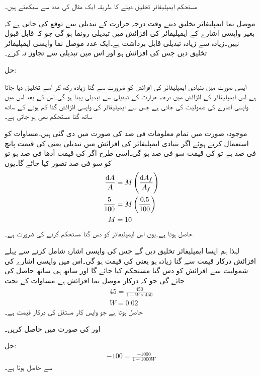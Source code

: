 مستحکم ایمپلیفائر تخلیق دینے کا طریقہ ایک مثال کی مدد سے سیکھتے ہیں۔

موصل نما ایمپلیفائر تخلیق دیتے وقت درجہ حرارت کے تبدیلی سے توقع کی جاتی ہے کہ بغیر واپسی اشارے کے ایمپلیفائر کی افزائش میں  تبدیلی رونما ہو گی جو کہ قابل قبول نہیں۔زیادہ سے
 زیادہ  تبدیلی قابل برداشت ہے۔ایک عدد موصل نما واپسی ایمپلیفائر تخلیق دیں جس کی افزائش  ہو اور اس میں تبدیلی  سے تجاوز نہ کرے۔

حل: 

ایسی صورت میں بنیادی ایمپلیفائر کی افزائش  کو ضرورت سے  گنا زیادہ رکھ کر اسے تخلیق دیا جاتا ہے۔اس ایمپلیفائر کے افزائش میں درجہ حرارت کے تبدیلی سے  تبدیلی پیدا ہو گی۔اس کے بعد اس میں واپسی اشارے کی شمولیت کی جاتی ہے جس سے ایمپلیفائر کی واپسی افزائش  گنا کم ہونے کے ساتھ ساتھ  گنا مستحکم بھی ہو جاتی ہے۔

موجودہ صورت میں تمام معلومات فی صد کی صورت میں دی گئی ہیں۔مساوات  کو استعمال کرتے ہوئے اگر بنیادی ایمپلیفائر کی افزائش میں تبدیلی یعنی   کی قیمت پانچ فی صد ہے تو  کی قیمت سو فی صد ہو گی۔اسی طرح اگر   کی قیمت  آدھا فی صد ہو تو  کو سو فی صد تصور کیا جائے گا۔یوں
\begin{align*}
\frac{\textup{d}A}{A} &=M  \left (\frac{\textup{d}A_f}{A_f} \right)\\
\frac{5}{100}&=M \left (\frac{0.5}{100} \right)\\
M &=10
\end{align*}
حاصل ہوتا ہے۔یوں اس ایمپلیفائر کو دس گنا مستحکم کرنے کی ضرورت ہے۔

لہٰذا ہم ایسا  ایمپلیفائر تخلیق دیں گے جس کی واپسی اشارہ شامل کرنے سے پہلے افزائش درکار قیمت سے   گنا زیادہ ہو  یعنی  کی قیمت  ہو گی۔اس میں واپسی اشارے کی شمولیت سے افزائش کو دس گنا مستحکم کیا جائے گا اور ساتھ ہی ساتھ  حاصل کی جائے گی جو کہ درکار موصل نما افزائش ہے۔مساوات  کے تحت
\begin{align*}
45 =\frac{450}{1+W \times 450} \\
W =\num{0.02}
\end{align*}
حاصل ہوتا ہے جو  واپس کار   مستقل کی درکار قیمت ہے۔

 اور  کی صورت میں  حاصل کریں۔

حل:
\begin{align*}
-100 = \frac{-1000}{1-1000 W}
\end{align*}
سے   حاصل ہوتا ہے۔

